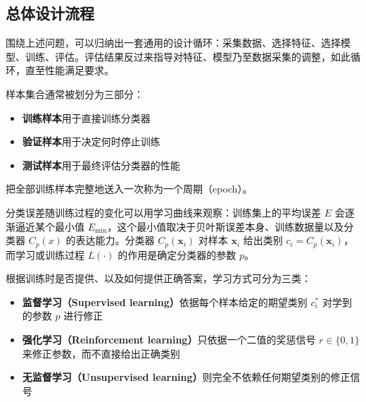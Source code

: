 \subsection{总体设计流程}

围绕上述问题，可以归纳出一套通用的设计循环：采集数据、选择特征、选择模型、训练、评估。评估结果反过来指导对特征、模型乃至数据采集的调整，如此循环，直至性能满足要求。

样本集合通常被划分为三部分：
\begin{itemize}
    \item \textbf{训练样本}用于直接训练分类器
    \item \textbf{验证样本}用于决定何时停止训练
    \item \textbf{测试样本}用于最终评估分类器的性能
\end{itemize}
把全部训练样本完整地送入一次称为一个周期（epoch）。

分类误差随训练过程的变化可以用学习曲线来观察：训练集上的平均误差 $E$ 会逐渐逼近某个最小值 $E_{\min}$，这个最小值取决于贝叶斯误差本身、训练数据量以及分类器 $C_p(x)$ 的表达能力。分类器 $C_p(\mathbf{x}_i)$ 对样本 $\mathbf{x}_i$ 给出类别 $c_i = C_p(\mathbf{x}_i)$，而学习或训练过程 $L(\cdot)$ 的作用是确定分类器的参数 $p$。

根据训练时是否提供、以及如何提供正确答案，学习方式可分为三类：
\begin{itemize}
    \item \textbf{监督学习（Supervised learning）}依据每个样本给定的期望类别 $c_i^*$ 对学到的参数 $p$ 进行修正
    \item \textbf{强化学习（Reinforcement learning）}只依据一个二值的奖惩信号 $r \in \{0,1\}$ 来修正参数，而不直接给出正确类别
    \item \textbf{无监督学习（Unsupervised learning）}则完全不依赖任何期望类别的修正信号
\end{itemize}